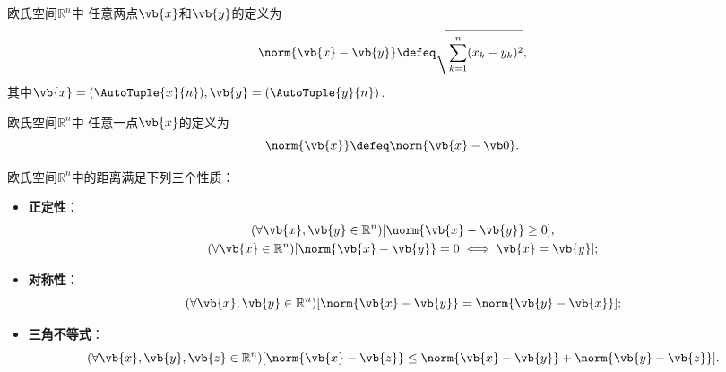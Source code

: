 \begin{definition}
欧氏空间\(\mathbb{R}^n\)中
任意两点\(\vb{x}\)和\(\vb{y}\)的定义为\begin{equation*}
	\norm{\vb{x} - \vb{y}}
	\defeq
	\sqrt{\sum_{k=1}^n (x_k-y_k)^2},
\end{equation*}
其中\(\vb{x}=(\AutoTuple{x}{n}),
\vb{y}=(\AutoTuple{y}{n})\).
\end{definition}
\begin{definition}
欧氏空间\(\mathbb{R}^n\)中
任意一点\(\vb{x}\)的定义为\begin{equation*}
	\norm{\vb{x}}
	\defeq
	\norm{\vb{x}-\vb0}.
\end{equation*}
\end{definition}
\begin{theorem}
欧氏空间\(\mathbb{R}^n\)中的距离满足下列三个性质：\begin{itemize}
	\item {\rm\bf 正定性}：\begin{gather*}
		(\forall \vb{x},\vb{y}\in\mathbb{R}^n)
		[\norm{\vb{x}-\vb{y}}\geq0], \\
		(\forall \vb{x}\in\mathbb{R}^n)
		[\norm{\vb{x}-\vb{y}}=0 \iff \vb{x}=\vb{y}];
	\end{gather*}
	\item {\rm\bf 对称性}：\begin{equation*}
		(\forall \vb{x},\vb{y}\in\mathbb{R}^n)
		[\norm{\vb{x}-\vb{y}}=\norm{\vb{y}-\vb{x}}];
	\end{equation*}
	\item {\rm\bf 三角不等式}：\begin{equation*}
		(\forall \vb{x},\vb{y},\vb{z}\in\mathbb{R}^n)
		[\norm{\vb{x}-\vb{z}}\leq\norm{\vb{x}-\vb{y}}+\norm{\vb{y}-\vb{z}}].
	\end{equation*}
\end{itemize}
\end{theorem}

